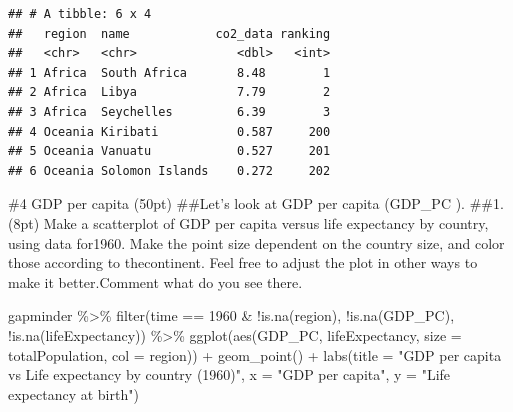\documentclass[
]{article}
\newenvironment{Shaded}{\begin{snugshade}}{\end{snugshade}}
\newcommand{\AttributeTok}[1]{\textcolor[rgb]{0.77,0.63,0.00}{#1}}
\newcommand{\DecValTok}[1]{\textcolor[rgb]{0.00,0.00,0.81}{#1}}
\newcommand{\FunctionTok}[1]{\textcolor[rgb]{0.00,0.00,0.00}{#1}}
\newcommand{\NormalTok}[1]{#1}
\newcommand{\SpecialCharTok}[1]{\textcolor[rgb]{0.00,0.00,0.00}{#1}}
\newcommand{\StringTok}[1]{\textcolor[rgb]{0.31,0.60,0.02}{#1}}
\begin{document}
\begin{verbatim}
## # A tibble: 6 x 4
##   region  name            co2_data ranking
##   <chr>   <chr>              <dbl>   <int>
## 1 Africa  South Africa       8.48        1
## 2 Africa  Libya              7.79        2
## 3 Africa  Seychelles         6.39        3
## 4 Oceania Kiribati           0.587     200
## 5 Oceania Vanuatu            0.527     201
## 6 Oceania Solomon Islands    0.272     202
\end{verbatim}

\#4 GDP per capita (50pt) \#\#Let's look at GDP per capita (GDP\_PC ).
\#\#1. (8pt) Make a scatterplot of GDP per capita versus life expectancy
by country, using data for1960. Make the point size dependent on the
country size, and color those according to thecontinent. Feel free to
adjust the plot in other ways to make it better.Comment what do you see
there.

\begin{Shaded}
\begin{Highlighting}[]
\NormalTok{gapminder }\SpecialCharTok{\%\textgreater{}\%}
  \FunctionTok{filter}\NormalTok{(time }\SpecialCharTok{==} \DecValTok{1960} \SpecialCharTok{\&} \SpecialCharTok{!}\FunctionTok{is.na}\NormalTok{(region),}
         \SpecialCharTok{!}\FunctionTok{is.na}\NormalTok{(GDP\_PC),}
         \SpecialCharTok{!}\FunctionTok{is.na}\NormalTok{(lifeExpectancy)) }\SpecialCharTok{\%\textgreater{}\%}
  \FunctionTok{ggplot}\NormalTok{(}\FunctionTok{aes}\NormalTok{(GDP\_PC, lifeExpectancy, }\AttributeTok{size =}\NormalTok{ totalPopulation, }\AttributeTok{col =}\NormalTok{ region)) }\SpecialCharTok{+}
    \FunctionTok{geom\_point}\NormalTok{() }\SpecialCharTok{+}
  \FunctionTok{labs}\NormalTok{(}\AttributeTok{title =} \StringTok{"GDP per capita vs Life expectancy by country (1960)"}\NormalTok{, }\AttributeTok{x =} \StringTok{"GDP per capita"}\NormalTok{, }\AttributeTok{y =} \StringTok{"Life expectancy at birth"}\NormalTok{)}
\end{Highlighting}
\end{Shaded}
\end{document}

